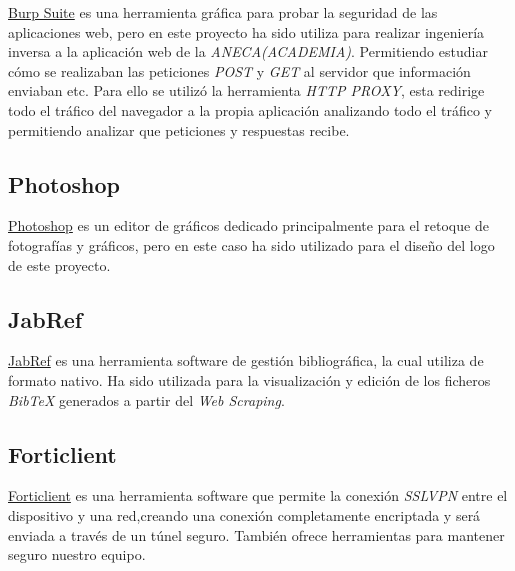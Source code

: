 \href{https://portswigger.net/burp}{Burp Suite} es una herramienta gráfica para probar la seguridad de las aplicaciones web, pero en este proyecto ha sido utiliza para realizar ingeniería inversa a la aplicación web de la \emph{ANECA(ACADEMIA)}. Permitiendo estudiar cómo se realizaban las peticiones \emph{POST} y \emph{GET} al servidor que información enviaban etc. Para ello se utilizó la herramienta \emph{HTTP PROXY}, esta redirige todo el tráfico del navegador a la propia aplicación analizando todo el tráfico y permitiendo analizar que peticiones y respuestas recibe.

\subsection{Photoshop}
\href {https://www.photoshop.com/}{Photoshop} es un editor de gráficos dedicado principalmente para el retoque de fotografías y gráficos, pero en este caso ha sido utilizado para el diseño del logo de este proyecto.

\subsection{JabRef}

\href {http://www.jabref.org/}{JabRef} es una herramienta software de gestión bibliográfica, la cual utiliza  de formato nativo. 
Ha sido utilizada para la visualización y edición de los ficheros \emph{BibTeX} generados a partir del \emph{Web Scraping}.

\subsection{Forticlient}

\href{https://forticlient.com/}{Forticlient} es una herramienta software que permite la conexión \emph{SSLVPN} entre el dispositivo y una red,creando una conexión completamente encriptada y será enviada a través de un túnel seguro. También ofrece herramientas para mantener seguro nuestro equipo. 